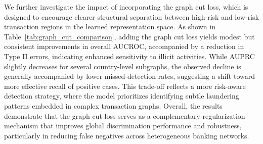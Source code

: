\documentclass[11pt,english]{article}
\begin{document}
\begin{table}[h!]
    \centering
    \caption{Performance comparison with and without graph cut loss}
    \label{tab:graph_cut_comparison}
\end{table}


We further investigate the impact of incorporating the graph cut loss, which is designed to encourage clearer structural separation between high-risk and low-risk transaction regions in the learned representation space. As shown in Table~\ref{tab:graph_cut_comparison}, adding the graph cut loss yields modest but consistent improvements in overall AUCROC, accompanied by a reduction in Type II errors, indicating enhanced sensitivity to illicit activities. While AUPRC slightly decreases for several country-level subgraphs, the observed decline is generally accompanied by lower missed-detection rates, suggesting a shift toward more effective recall of positive cases. This trade-off reflects a more risk-aware detection strategy, where the model prioritizes identifying subtle laundering patterns embedded in complex transaction graphs. Overall, the results demonstrate that the graph cut loss serves as a complementary regularization mechanism that improves global discrimination performance and robustness, particularly in reducing false negatives across heterogeneous banking networks.
\end{document}
